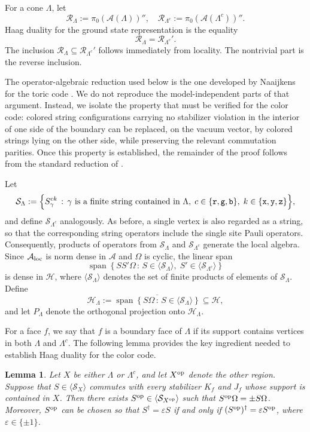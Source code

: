 \documentclass[a4paper,11pt]{article}
\newtheorem{lemma}[theorem]{Lemma}
\theoremstyle{definition}
\theoremstyle{remark}
\theoremstyle{remark}
\begin{document}
For a cone $\Lambda$, let
\[
    \mathcal R_\Lambda := \pi_0(\mathcal A(\Lambda))'', \quad \mathcal{R}_{\Lambda^c} := \pi_0(\mathcal A(\Lambda^c))''.
\]
Haag duality for the ground state representation is the equality
\[
    \mathcal R_\Lambda = \mathcal R_{\Lambda^c}'.
\]
The inclusion $\mathcal R_\Lambda \subseteq \mathcal R_{\Lambda^c}'$ follows immediately from locality. The nontrivial part is the reverse inclusion.

The operator-algebraic reduction used below is the one developed by Naaijkens for the toric code \cite[Section~3]{naaijkens2012haag}. We do not reproduce the model-independent parts of that argument. Instead, we isolate the property that must be verified for the color code: colored string configurations carrying no stabilizer violation in the interior of one side of the boundary can be replaced, on the vacuum vector, by colored strings lying on the other side, while preserving the relevant commutation parities. Once this property is established, the remainder of the proof follows from the standard reduction of
\cite{naaijkens2012haag}.

Let 
\[
    \mathcal S_\Lambda := \Bigl\{S_\gamma^{ck}\,:\,\gamma \text{ is a finite string contained in }\Lambda,\;c\in\{\mathtt r,\mathtt g,\mathtt b\},\;k\in\{\mathtt x,\mathtt y,\mathtt z\}\Bigr\},
\]
and define $\mathcal S_{\Lambda^c}$ analogously. As before, a single vertex is also regarded as a string, so that the corresponding string operators include the single site Pauli operators. Consequently, products of operators from $\mathcal S_\Lambda$ and $\mathcal S_{\Lambda^c}$ generate the local algebra. Since $\mathcal A_{\rm loc}$ is norm dense in $\mathcal A$ and $\Omega$ is cyclic, the linear span
\[
    \operatorname{span}\left\{SS'\Omega\,:\,S\in\langle\mathcal S_\Lambda\rangle,\;S'\in\langle\mathcal S_{\Lambda^c}\rangle\right\}
\]
is dense in $\mathcal H$, where $\langle\mathcal S_\Lambda\rangle$ denotes the set of finite products of elements of $\mathcal S_\Lambda$.
Define
\[
    \mathcal H_\Lambda:=\overline{\operatorname{span}\left\{S\Omega\,:\,S\in\langle\mathcal S_\Lambda\rangle\right\}} \subseteq \mathcal H,
\]
and let $P_\Lambda$ denote the orthogonal projection onto $\mathcal H_\Lambda$.

For a face $f$, we say that $f$ is a boundary face of $\Lambda$ if its support contains vertices in both $\Lambda$ and $\Lambda^c$. The following lemma provides the key ingredient needed to establish Haag duality for the color code.

\begin{lemma}\label{lem:boundary_string_replacement}
    Let $X$ be either $\Lambda$ or $\Lambda^c$, and let $X^{\rm op}$ denote the other region. Suppose that $S\in\langle\mathcal S_X\rangle$ commutes with every stabilizer $K_f$ and $J_f$ whose support is contained in $X$. Then there exists $S^{\rm op} \in \langle\mathcal S_{X^{\rm op}}\rangle$ such that $S^{\rm op}\Omega = \pm S\Omega$. Moreover, $S^{\rm op}$ can be chosen so that $S^\dagger=\varepsilon  S$ if and only if $(S^{\rm op})^\dagger=\varepsilon  S^{\rm op}$, where $\varepsilon\in \{\pm 1\}$. 
\end{lemma}
\end{document}

